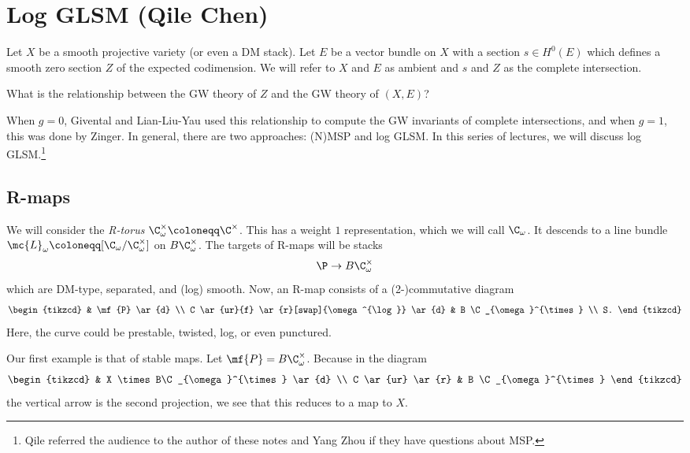 \section{Log GLSM (Qile Chen)}%
\label{sec:Log GLSM (Qile Chen)}

Let \(X\) be a smooth projective variety (or even a DM stack). Let \(E\) be a vector bundle on \(X\) with a section \(s \in H^0(E)\) which defines a smooth zero section \(Z\) of the expected codimension. We will refer to \(X\) and \(E\) as ambient and \(s\) and \(Z\) as the complete intersection.

\begin{quest}
    What is the relationship between the GW theory of \(Z\) and the GW theory of \((X, E)\)?
\end{quest}

When \(g = 0\), Givental and Lian-Liu-Yau used this relationship to compute the GW invariants of complete intersections, and when \(g = 1\), this was done by Zinger. In general, there are two approaches: (N)MSP and log GLSM. In this series of lectures, we will discuss log GLSM.\footnote{Qile referred the audience to the author of these notes and Yang Zhou if they have questions about MSP.}

\subsection{R-maps}%
\label{sub:R-maps}

We will consider the \textit{R-torus} \(\C^{\times}_{\omega} \coloneqq \C^{\times}\). This has a weight \(1\) representation, which we will call \(\C_{\omega}\). It descends to a line bundle \(\mc{L}_{\omega} \coloneqq [\C_{\omega} / \C^{\times}_{\omega}]\) on \(B \C_{\omega}^{\times}\). The targets of R-maps will be stacks
\[ \P \to B \C^{\times}_{\omega} \]
which are DM-type, separated, and (log) smooth. Now, an R-map consists of a (2-)commutative diagram
\begin{equation*}
\begin{tikzcd}
    & \mf{P} \ar{d} \\
    C \ar{ur}{f} \ar{r}[swap]{\omega^{\log}} \ar{d} & B \C_{\omega}^{\times} \\
    S.
\end{tikzcd}
\end{equation*}
Here, the curve could be prestable, twisted, log, or even punctured.

\begin{exm}
    Our first example is that of stable maps. Let \(\mf{P} = B\C_{\omega}^{\times}\). Because in the diagram
    \begin{equation*}
    \begin{tikzcd}
        & X \times B\C_{\omega}^{\times} \ar{d} \\
        C \ar{ur} \ar{r} & B \C_{\omega}^{\times}
    \end{tikzcd}
    \end{equation*}
    the vertical arrow is the second projection, we see that this reduces to a map to \(X\).
\end{exm}

